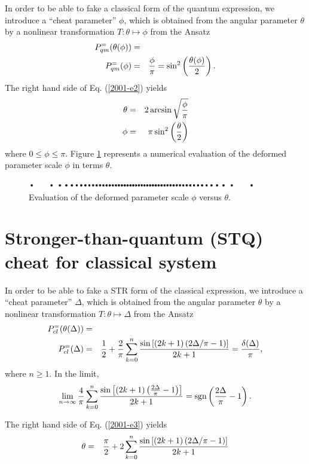 In order to be able to fake
a classical form of the quantum expression,
we introduce a ``cheat parameter'' $\phi $,
which is obtained from the angular parameter $\theta $
by a nonlinear transformation
$T:\theta \mapsto \phi$
from the Ansatz
\begin{eqnarray}
P^{=}_{qm}(\theta (\phi ))
&=&
\nonumber \\
P^{=}_{qm}(\phi )
&=&
{\phi \over \pi}=
\sin^2 \left({\theta (\phi ) \over 2}\right).
\label{2001-e2}
\end{eqnarray}
The right hand side of Eq. (\ref{2001-e2})
yields
\begin{eqnarray}
\theta &=& 2\arcsin \sqrt{{\phi \over \pi}}\\
\phi &=& \pi \sin^2 \left({\theta \over 2} \right)
\end{eqnarray}
where $0\le \phi  \le \pi$.
Figure   \ref{2001-cheat-f2} represents a numerical evaluation
of the deformed parameter scale $\phi$ in terms $\theta$.
\begin{figure}
 \includegraphics[width=10cm]{2001-cheat-f2.eps}
 \caption{Evaluation of the deformed parameter scale $\phi$ versus $\theta$.}
\label{2001-cheat-f2}
\end{figure}



\section{Stronger-than-quantum (STQ) cheat for classical system}

In order to be able to fake
a STR form of the classical expression,
we introduce a ``cheat parameter'' $\Delta $,
which is obtained from the angular parameter $\theta $
by a nonlinear transformation
$T:\theta \mapsto \Delta$
from the Ansatz
\begin{eqnarray}
P^{=}_{cl}(\theta (\Delta ))
&=&
\nonumber \\
P^{=}_{cl}(\Delta )
&=&
{1\over 2}
+
{2\over \pi}
\sum_{k=0}^n
{
\sin \left[(2k+1)\left({2\Delta/ \pi}-1\right) \right]
\over 2k+1}
=
{\delta (\Delta )\over \pi }
,
\label{2001-e3}
\end{eqnarray}
where $n\ge 1$.
In the limit,
$$\lim_{n\rightarrow \infty}
{4\over \pi}
\sum_{k=0}^n
{
\sin \left[(2k+1)\left({2\Delta \over \pi}-1\right) \right]
\over 2k+1}
=
{\rm sgn}\left({2\Delta \over \pi}-1\right).
$$

The right hand side of Eq. (\ref{2001-e3})
yields
\begin{eqnarray}
\theta &=&
{\pi \over 2}
+
{2}
\sum_{k=0}^n
{
\sin \left[(2k+1)\left({2\Delta/ \pi}-1\right) \right]
\over 2k+1}
\end{eqnarray}

